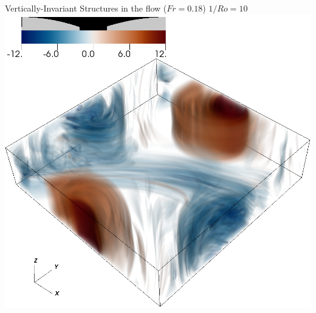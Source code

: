 \documentclass[aspecttatio=169]{beamer}
\begin{document}
\begin{frame}{Vertically-Invariant Structures in the flow ($Fr = 0.18$)}
    \emp
        \centering
        $1/Ro = 10$
        \includegraphics[width=.95\textwidth]{images/vortz_Om10_vr2.png}
    \emp
\end{frame}
\end{document}
